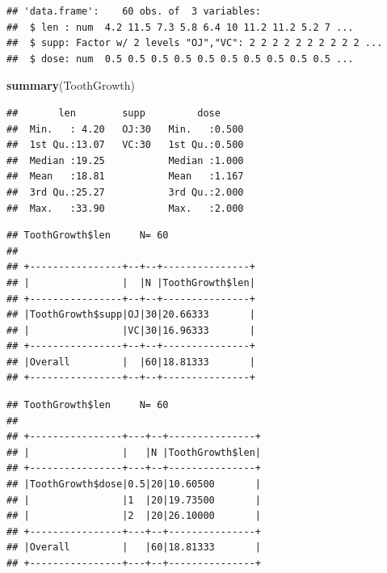 \documentclass[]{article}
\newenvironment{Shaded}{\begin{snugshade}}{\end{snugshade}}
\newcommand{\KeywordTok}[1]{\textcolor[rgb]{0.13,0.29,0.53}{\textbf{#1}}}
\newcommand{\StringTok}[1]{\textcolor[rgb]{0.31,0.60,0.02}{#1}}
\newcommand{\OperatorTok}[1]{\textcolor[rgb]{0.81,0.36,0.00}{\textbf{#1}}}
\newcommand{\NormalTok}[1]{#1}
\begin{document}
\begin{verbatim}
## 'data.frame':    60 obs. of  3 variables:
##  $ len : num  4.2 11.5 7.3 5.8 6.4 10 11.2 11.2 5.2 7 ...
##  $ supp: Factor w/ 2 levels "OJ","VC": 2 2 2 2 2 2 2 2 2 2 ...
##  $ dose: num  0.5 0.5 0.5 0.5 0.5 0.5 0.5 0.5 0.5 0.5 ...
\end{verbatim}

\begin{Shaded}
\begin{Highlighting}[]
        \KeywordTok{summary}\NormalTok{(ToothGrowth)}
\end{Highlighting}
\end{Shaded}

\begin{verbatim}
##       len        supp         dose      
##  Min.   : 4.20   OJ:30   Min.   :0.500  
##  1st Qu.:13.07   VC:30   1st Qu.:0.500  
##  Median :19.25           Median :1.000  
##  Mean   :18.81           Mean   :1.167  
##  3rd Qu.:25.27           3rd Qu.:2.000  
##  Max.   :33.90           Max.   :2.000
\end{verbatim}

\begin{Shaded}
\end{Shaded}

\begin{verbatim}
## ToothGrowth$len     N= 60 
## 
## +----------------+--+--+---------------+
## |                |  |N |ToothGrowth$len|
## +----------------+--+--+---------------+
## |ToothGrowth$supp|OJ|30|20.66333       |
## |                |VC|30|16.96333       |
## +----------------+--+--+---------------+
## |Overall         |  |60|18.81333       |
## +----------------+--+--+---------------+
\end{verbatim}

\begin{Shaded}
\end{Shaded}

\begin{verbatim}
## ToothGrowth$len     N= 60 
## 
## +----------------+---+--+---------------+
## |                |   |N |ToothGrowth$len|
## +----------------+---+--+---------------+
## |ToothGrowth$dose|0.5|20|10.60500       |
## |                |1  |20|19.73500       |
## |                |2  |20|26.10000       |
## +----------------+---+--+---------------+
## |Overall         |   |60|18.81333       |
## +----------------+---+--+---------------+
\end{verbatim}
\end{document}
